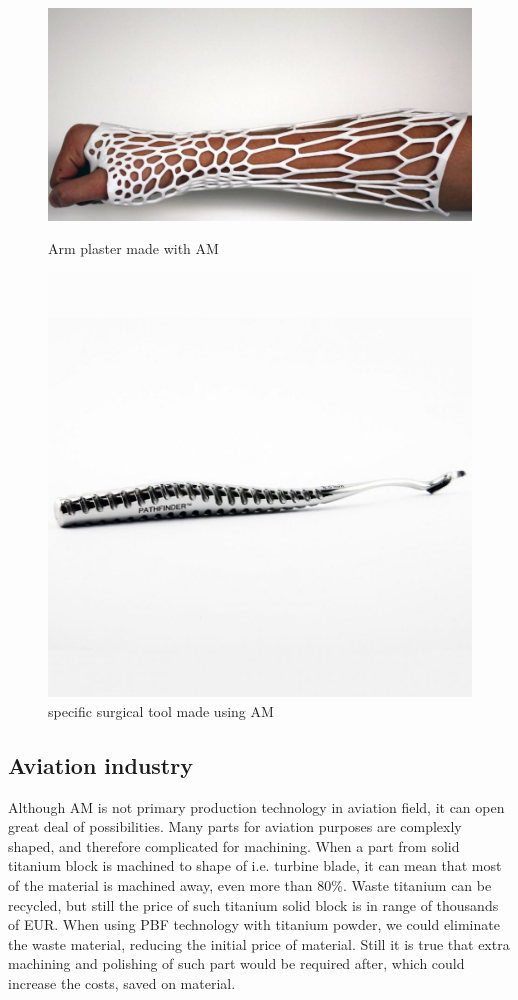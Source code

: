 \documentclass[a4paper, twoside, 11pt]{report}
\begin{document}
\begin{figure}[h]
  \centering
  \begin{minipage}[]{0.45\textwidth}
    \includegraphics[width=\textwidth]{armPlaster}
    \caption{Arm plaster made with AM}
  \end{minipage}
  \hfill
  \begin{minipage}[]{0.45\textwidth}
    \includegraphics[width=\textwidth]{surgicalTool}
    \caption{specific surgical tool made using AM}
  \end{minipage}
\end{figure}
\subsection{Aviation industry}
Although AM is not primary production technology in aviation field, it can open great deal of possibilities. Many parts for aviation purposes are complexly shaped, and therefore complicated for machining. When a part from solid titanium block is machined to shape of i.e. turbine blade, it can mean that most of the material is machined away, even more than 80\%. Waste titanium can be recycled, but still the price of such titanium solid block is in range of thousands of EUR. When using PBF technology with titanium powder, we could eliminate the waste material, reducing the initial price of material. Still it is true that extra machining and polishing of such part would be required after, which could increase the costs, saved on material.
\end{document}
